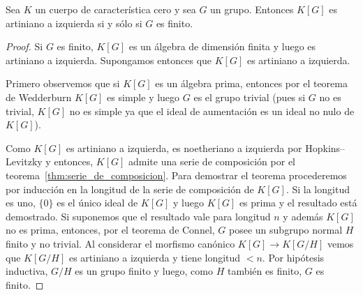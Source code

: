 

\begin{theorem}[Connel]
	Sea $K$ un cuerpo de característica cero y sea $G$ un grupo. Entonces
	$K[G]$ es artiniano a izquierda si y sólo si $G$ es finito.
\end{theorem}

\begin{proof}
	Si $G$ es finito, $K[G]$ es un álgebra de dimensión finita y luego
	es artiniano a izquierda. Supongamos entonces que $K[G]$ es artiniano
	a izquierda. 
	
	Primero observemos que si $K[G]$ es un álgebra prima, entonces por el
	teorema de Wedderburn $K[G]$ es simple y luego
	$G$ es el grupo trivial (pues si $G$ no es trivial, $K[G]$ no es simple ya
	que el ideal de aumentación es un ideal no nulo de $K[G]$).

	Como $K[G]$ es artiniano a izquierda, es noetheriano a izquierda por
	Hopkins--Levitzky y entonces, $K[G]$ admite una serie de composición por el
	teorema~\ref{thm:serie_de_composicion}.  Para demostrar el teorema
	procederemos por inducción en la longitud de la serie de composición de
	$K[G]$. Si la longitud es uno, $\{0\}$ es el único ideal de $K[G]$ y luego
	$K[G]$ es prima y el resultado está demostrado. Si suponemos que el
	resultado vale para longitud $n$ y además $K[G]$ no es prima, entonces, por
	el teorema de Connel, $G$ posee un subgrupo normal $H$ finito y no trivial. Al
	considerar el morfismo canónico $K[G]\to K[G/H]$ vemos que $K[G/H]$ es
	artiniano a izquierda y tiene longitud $<n$. Por hipótesis inductiva, $G/H$
	es un grupo finito y luego, como $H$ también es finito, $G$ es finito.
\end{proof}
